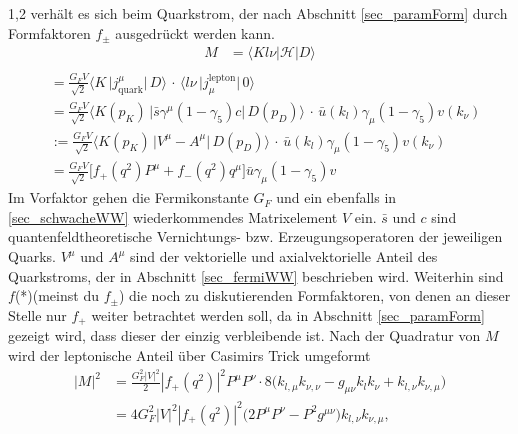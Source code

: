 \documentclass[11pt,a4paper,twoside]{report}
\begin{document}
\begin{spacing}{1,2}
verhält es sich beim Quarkstrom, der nach Abschnitt \ref{sec_paramForm} durch Formfaktoren $f_\pm$ ausgedrückt werden kann.
\begin{align*}
 M &= \big\langle Kl\nu|\mathcal{H}|D\big\rangle\nonumber\\
 \end{align*}
 \begin{align}
 &= \frac{G_F V}{\sqrt{2}}\big\langle K\, \big|j_\text{quark}^\mu\big|\,D \big\rangle \,\cdot\,\big\langle l\nu\,\big|j_\mu^\text{lepton}\big|\,0\big\rangle\nonumber\\
 &= \frac{G_F V}{\sqrt{2}}\big\langle K(p_K)\, \big|\bar s \gamma^\mu(1-\gamma_5) c \big|\,D(p_D) \big\rangle \, \cdot \,\bar u(k_l) \gamma_\mu(1-\gamma_5)v(k_\nu)\nonumber\\
 &:= \frac{G_F V}{\sqrt{2}}\big\langle K(p_K)\, \big|V^\mu - A^\mu\big|\,D(p_D) \big\rangle \, \cdot \,\bar u(k_l) \gamma_\mu(1-\gamma_5)v(k_\nu)\nonumber\\
 &=\frac{G_F V}{\sqrt{2}} \big[f_+(q^2) P^\mu  + f_-(q^2) q^\mu\big] \bar u \gamma_\mu(1-\gamma_5)v
 \label{eq_fermiMG_F}
 \end{align}
Im Vorfaktor gehen die Fermikonstante $G_F$ und ein ebenfalls in \ref{sec_schwacheWW} wiederkommendes Matrixelement $V$ ein. $\bar s$ und $c$ sind quantenfeldtheoretische 
Vernichtungs- bzw. Erzeugungsoperatoren der jeweiligen Quarks. $V^\mu$ und $A^\mu$ sind der vektorielle und axialvektorielle Anteil des Quarkstroms, der 
in Abschnitt \ref{sec_fermiWW} beschrieben wird. Weiterhin sind $f$(*)(meinst du $f_\pm$) die noch zu
diskutierenden Formfaktoren, von denen an dieser Stelle nur $f_+$ weiter betrachtet werden soll, da in Abschnitt \ref{sec_paramForm} gezeigt wird, dass dieser
der einzig verbleibende ist. Nach der Quadratur von $M$ wird der leptonische Anteil über 
Casimirs Trick \cite{Griffiths} umgeformt
\begin{align}
 \big|M\big|^2 &= \frac{G_F^2|V|^2}{2}|f_+(q^2)|^2 P^\mu P^\nu \cdot 8\big(k_{l,\mu} k_{\nu,\nu} - g_{\mu\nu}k_lk_\nu + k_{l,\nu}k_{\nu,\mu}\big)\nonumber\\
 &=4G_F^2|V|^2 |f_+(q^2)|^2 \big(2P^\mu P^\nu - P^2 g^{\mu\nu}\big) k_{l,\nu}k_{\nu,\mu},
 \label{eq_fermiMelement}
\end{align}

\end{spacing}
\end{document}
